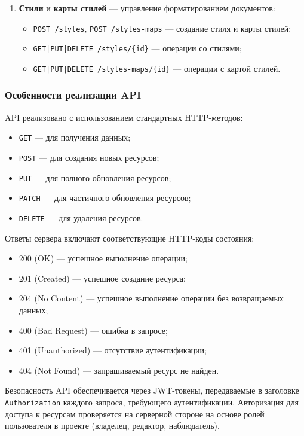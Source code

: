 \begin{enumerate}[wide=12.5mm, leftmargin=12.5mm]
    \item \textbf{Стили} и \textbf{карты стилей} — управление форматированием документов:
    \begin{itemize}[wide=12.5mm, leftmargin=12.5mm]
        \item \texttt{POST /styles}, \texttt{POST /styles-maps} — создание стиля и карты стилей;
        \item \texttt{GET|PUT|DELETE /styles/\{id\}} — операции со стилями;
        \item \texttt{GET|PUT|DELETE /styles-maps/\{id\}} — операции с картой стилей.
    \end{itemize}
\end{enumerate}

\subsubsection{Особенности реализации API}

API реализовано с использованием стандартных HTTP-методов:
\begin{itemize}[wide=12.5mm, leftmargin=12.5mm]
    \item \texttt{GET} — для получения данных;
    \item \texttt{POST} — для создания новых ресурсов;
    \item \texttt{PUT} — для полного обновления ресурсов;
    \item \texttt{PATCH} — для частичного обновления ресурсов;
    \item \texttt{DELETE} — для удаления ресурсов.
\end{itemize}

Ответы сервера включают соответствующие HTTP-коды состояния:
\begin{itemize}[wide=12.5mm, leftmargin=12.5mm]
    \item 200 (OK) — успешное выполнение операции;
    \item 201 (Created) — успешное создание ресурса;
    \item 204 (No Content) — успешное выполнение операции без возвращаемых данных;
    \item 400 (Bad Request) — ошибка в запросе;
    \item 401 (Unauthorized) — отсутствие аутентификации;
    \item 404 (Not Found) — запрашиваемый ресурс не найден.
\end{itemize}

Безопасность API обеспечивается через JWT-токены, передаваемые в заголовке \texttt{Authorization} каждого запроса, требующего аутентификации.
Авторизация для доступа к ресурсам проверяется на серверной стороне на основе ролей пользователя в проекте (владелец, редактор, наблюдатель).


